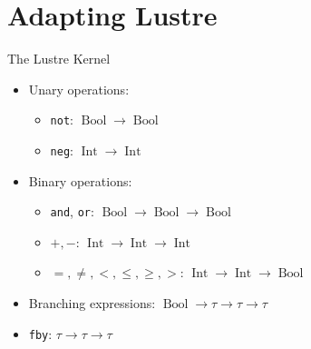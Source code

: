 \documentclass{beamer}
\DeclareMathOperator{\Bool}{Bool}
\DeclareMathOperator{\Int}{Int}
\begin{document}
\section{Adapting Lustre}

\begin{frame}{The Lustre Kernel}
    \begin{itemize}
        \setlength{\itemsep}{6pt}
        \item Unary operations:
              \begin{itemize}
                  \setlength{\itemsep}{3pt}
                  \item \texttt{not}: $\Bool \to \Bool$
                  \item \texttt{neg}: $\Int \to \Int$
              \end{itemize}
        \item Binary operations:
              \begin{itemize}
                  \setlength{\itemsep}{3pt}
                  \item \texttt{and}, \texttt{or}: $\Bool \to \Bool \to \Bool$
                  \item $+, -$: $\Int \to \Int \to \Int$
                  \item $=, \neq, <, \leqslant, \geqslant, >$: $\Int \to \Int \to \Bool$
              \end{itemize}
        \item Branching expressions: $\Bool \to \tau \to \tau \to \tau$
        \item \texttt{fby}: $\tau \to \tau \to \tau$
    \end{itemize}
\end{frame}
\end{document}

